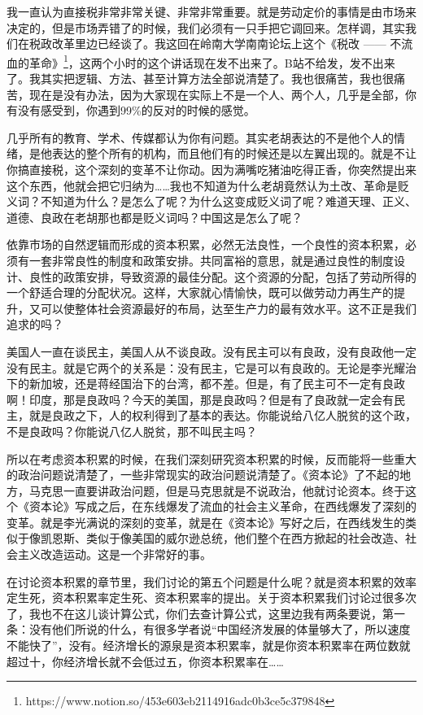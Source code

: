 \documentclass[UTF8, 12pt, a4paper]{ctexrep}
\begin{document}
我一直认为直接税非常非常关键、非常非常重要。就是劳动定价的事情是由市场来决定的，但是市场弄错了的时候，我们必须有一只手把它调回来。怎样调，其实我们在税政改革里边已经谈了。我这回在岭南大学南南论坛上这个《税改 —— 不流血的革命》\footnote{https://www.notion.so/453e603eb2114916adc0b3ce5c379848}，这两个小时的这个讲话现在发不出来了。B站不给发，发不出来了。我其实把逻辑、方法、甚至计算方法全部说清楚了。我也很痛苦，我也很痛苦，现在是没有办法，因为大家现在实际上不是一个人、两个人，几乎是全部，你有没有感受到，你遇到99\%的反对的时候的感觉。

几乎所有的教育、学术、传媒都认为你有问题。其实老胡表达的不是他个人的情绪，是他表达的整个所有的机构，而且他们有的时候还是以左翼出现的。就是不让你搞直接税，这个深刻的变革不让你动。因为满嘴吃猪油吃得正香，你突然提出来这个东西，他就会把它归纳为……我也不知道为什么老胡竟然认为土改、革命是贬义词？不知道为什么？是怎么了呢？为什么这变成贬义词了呢？难道天理、正义、道德、良政在老胡那也都是贬义词吗？中国这是怎么了呢？

依靠市场的自然逻辑而形成的资本积累，必然无法良性，一个良性的资本积累，必须有一套非常良性的制度和政策安排。共同富裕的意思，就是通过良性的制度设计、良性的政策安排，导致资源的最佳分配。这个资源的分配，包括了劳动所得的一个舒适合理的分配状况。这样，大家就心情愉快，既可以做劳动力再生产的提升，又可以使整体社会资源最好的布局，达至生产力的最有效水平。这不正是我们追求的吗？

美国人一直在谈民主，美国人从不谈良政。没有民主可以有良政，没有良政他一定没有民主。就是它两个的关系是：没有民主，它是可以有良政的。无论是李光耀治下的新加坡，还是蒋经国治下的台湾，都不差。但是，有了民主可不一定有良政啊！印度，那是良政吗？今天的美国，那是良政吗？但是有了良政就一定会有民主，就是良政之下，人的权利得到了基本的表达。你能说给八亿人脱贫的这个政，不是良政吗？你能说八亿人脱贫，那不叫民主吗？

所以在考虑资本积累的时候，在我们深刻研究资本积累的时候，反而能将一些重大的政治问题说清楚了，一些非常现实的政治问题说清楚了。《资本论》了不起的地方，马克思一直要讲政治问题，但是马克思就是不说政治，他就讨论资本。终于这个《资本论》写成之后，在东线爆发了流血的社会主义革命，在西线爆发了深刻的变革。就是李光满说的深刻的变革，就是在《资本论》写好之后，在西线发生的类似于像凯恩斯、类似于像美国的威尔逊总统，他们整个在西方掀起的社会改造、社会主义改造运动。这是一个非常好的事。

在讨论资本积累的章节里，我们讨论的第五个问题是什么呢？就是资本积累的效率定生死，资本积累率定生死、资本积累率的提出。关于资本积累我们讨论过很多次了，我也不在这儿谈计算公式，你们去查计算公式，这里边我有两条要说，第一条：没有他们所说的什么，有很多学者说“中国经济发展的体量够大了，所以速度不能快了”，没有。经济增长的源泉是资本积累率，就是你资本积累率在两位数就超过十，你经济增长就不会低过五，你资本积累率在……
\end{document}
